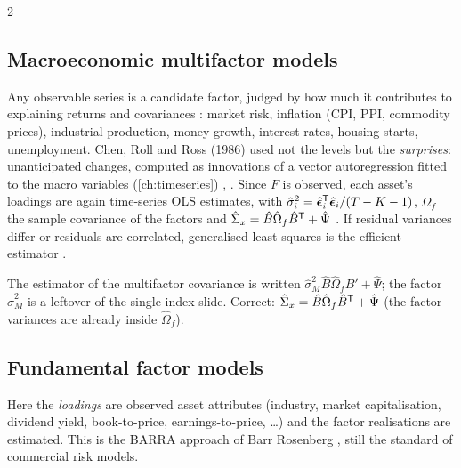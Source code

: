 \begin{paracol}{2}
\subsection{Macroeconomic multifactor models}
Any observable series is a candidate factor, judged by how much it contributes to explaining returns and
covariances : market risk, inflation (CPI, PPI, commodity prices), industrial production, money
growth, interest rates, housing starts, unemployment. Chen, Roll and Ross (1986) used not the levels but the
\emph{surprises}: unanticipated changes, computed as innovations of a vector autoregression fitted to the macro
variables (\cref{ch:timeseries}) , . Since $F$ is observed, each asset's
loadings are again time-series OLS estimates, with $\hat\sigma_i^2=\hat{\bm\epsilon}_i^{\mathsf T}\hat{\bm\epsilon}_i/(T-K-1)$,
$\hat\Omega_f$ the sample covariance of the factors and $\hat\Sigma_x=\hat B\hat\Omega_f\hat B^{\mathsf T}+\hat\Psi$ .
If residual variances differ or residuals are correlated, generalised least squares is the efficient
estimator .

\begin{coursenote}
The estimator of the multifactor covariance is written $\hat\sigma_M^2\hat B\hat\Omega_f\hat B'+\hat\Psi$; the factor
$\hat\sigma_M^2$ is a leftover of the single-index slide. Correct: $\hat\Sigma_x=\hat B\hat\Omega_f\hat B^{\mathsf T}+\hat\Psi$ (the factor
variances are already inside $\hat\Omega_f$).
\end{coursenote}

\subsection{Fundamental factor models}
Here the \emph{loadings} are observed asset attributes (industry, market capitalisation, dividend yield,
book-to-price, earnings-to-price, \dots) and the factor realisations are estimated. This is the BARRA approach
of Barr Rosenberg , still the standard of commercial risk models.


\end{paracol}
